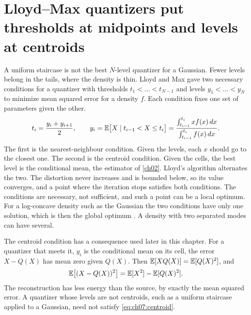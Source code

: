 

\section{Lloyd--Max quantizers put thresholds at midpoints and levels at centroids}\label{sec:ch07:lloyd}

A uniform staircase is not the best $N$-level quantizer for a Gaussian. Fewer levels belong in the tails, where the density is thin. Lloyd \cite{lloyd1982} and Max \cite{max1960} gave two necessary conditions for a quantizer with thresholds $t_1<\dots<t_{N-1}$ and levels $y_1<\dots<y_N$ to minimize mean squared error for a density $f$. Each condition fixes one set of parameters given the other.
\begin{equation}\label{eq:ch07:lloydmax}
t_i=\frac{y_i+y_{i+1}}{2},\qquad
y_i=\mathbb{E}\big[X\mid t_{i-1}<X\le t_i\big]=\frac{\int_{t_{i-1}}^{t_i}x f(x)\,dx}{\int_{t_{i-1}}^{t_i}f(x)\,dx}.
\end{equation}
The first is the nearest-neighbour condition. Given the levels, each $x$ should go to the closest one. The second is the centroid condition. Given the cells, the best level is the conditional mean, the estimator of \cref{ch02}. Lloyd's algorithm alternates the two. The distortion never increases and is bounded below, so its value converges, and a point where the iteration stops satisfies both conditions. The conditions are necessary, not sufficient, and such a point can be a local optimum. For a log-concave density such as the Gaussian the two conditions have only one solution, which is then the global optimum \cite{grayneuhoff1998}. A density with two separated modes can have several.

The centroid condition has a consequence used later in this chapter. For a quantizer that meets it, $y_i$ is the conditional mean on its cell, the error $X-Q(X)$ has mean zero given $Q(X)$. Then $\mathbb{E}[XQ(X)]=\mathbb{E}[Q(X)^2]$, and
\begin{equation}\label{eq:ch07:centroid}
\mathbb{E}\big[(X-Q(X))^2\big]=\mathbb{E}[X^2]-\mathbb{E}[Q(X)^2].
\end{equation}
The reconstruction has less energy than the source, by exactly the mean squared error. A quantizer whose levels are not centroids, such as a uniform staircase applied to a Gaussian, need not satisfy \cref{eq:ch07:centroid}.

